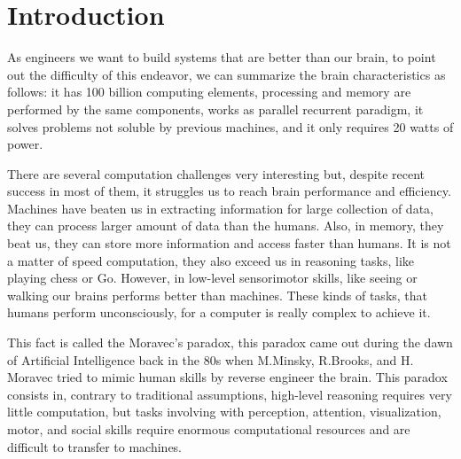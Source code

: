 \chapter{Introduction}\label{cap.introduccion}

\setlength{\parindent}{0pt}

%

As engineers we want to build systems that are better than our brain, to point out the difficulty of this endeavor, we can summarize the brain characteristics as follows: it has 100 billion computing elements, processing and memory are performed by the same components, works as parallel recurrent paradigm, it solves problems not soluble by previous machines, and it only requires 20 watts of power.


There are several computation challenges very interesting but, despite recent success in most of them, it struggles us to reach brain performance and efficiency. Machines have beaten us in extracting information for large collection of data, they can process larger amount of data than the humans. Also, in memory, they beat us, they can store more information and access faster than humans. It is not a matter of speed computation, they also exceed us in reasoning tasks, like playing chess or Go. However, in low-level sensorimotor skills, like seeing or walking our brains performs better than machines. These kinds of tasks, that humans perform unconsciously, for a computer is really complex to achieve it.

This fact is called the Moravec's paradox, this paradox came out during the dawn of Artificial Intelligence back in the 80s when M.Minsky, R.Brooks, and H. Moravec tried to mimic human skills by reverse engineer the brain. This paradox consists in, contrary to traditional assumptions, high-level reasoning requires very little computation, but tasks involving with  perception, attention, visualization, motor, and social skills require enormous computational resources and are difficult to transfer to machines.

